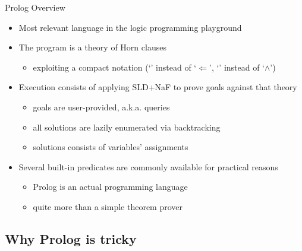 \documentclass[presentation]{beamer}\mode<presentation>{\usetheme{AMSBolognaFC}}
\begin{document}
\begin{frame}{Prolog Overview}
    \begin{itemize}
        \item Most relevant language in the \alert{logic programming} playground

        \vfill

        \item The \alert{program} is a \alert{theory} of Horn clauses
        \begin{itemize}
            \item exploiting a compact notation (`\pl{:-}' instead of `$\Leftarrow$', `\pl{,}' instead of `$\wedge$')
        \end{itemize}

        \vfill

        \item Execution consists of applying SLD+NaF to prove \alert{goals} against that theory
        \begin{itemize}
            \item goals are user-provided, a.k.a. \alert{queries}
            \item all solutions are \alert{lazily} enumerated via \alert{backtracking}
            \item solutions consists of variables' \alert{assignments}
        \end{itemize}

        \vfill

        \item Several built-in predicates are commonly available for practical reasons
        \begin{itemize}
            \item Prolog is an actual programming language
            \item quite more than a simple theorem prover
        \end{itemize}
    \end{itemize}
\end{frame}

\subsection{Why Prolog is tricky}
\end{document}
